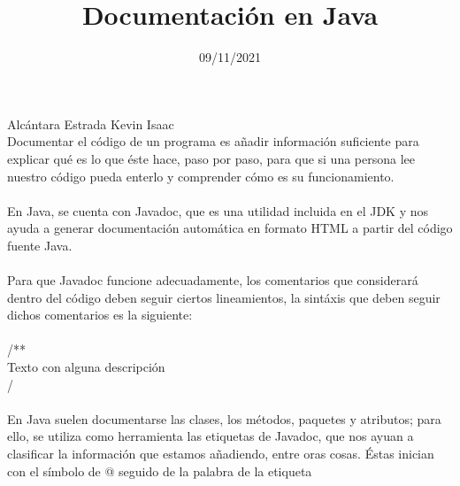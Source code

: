 \documentclass[20pt]{article}
\begin{document}
\title{Documentación en Java}
\date{09/11/2021}
\maketitle

\setlength{\parindent}{0px}

Alcántara Estrada Kevin Isaac\\

{\large Documentar el código de un programa es añadir información suficiente para explicar qué es lo que éste hace, paso por paso, para que si una persona lee nuestro código pueda enterlo y comprender cómo es su funcionamiento.}\\\\

{\large En Java, se cuenta con Javadoc, que es una utilidad incluida en el JDK y nos ayuda a generar documentación automática en formato HTML a partir del código fuente Java.}\\\\

{\large Para que Javadoc funcione adecuadamente, los comentarios que considerará dentro del código deben seguir ciertos lineamientos, la sintáxis que deben seguir dichos comentarios es la siguiente: }\\\\


{\large /**}\\
{\large * Texto con alguna descripción}\\
{\large */}\\\\

{\large En Java suelen documentarse las clases, los métodos, paquetes y atributos; para ello, se utiliza como herramienta las etiquetas de Javadoc, que nos ayuan a clasificar la información que estamos añadiendo, entre oras cosas. Éstas inician con el símbolo de @ seguido de la palabra de la etiqueta}\\\\
\end{document}
